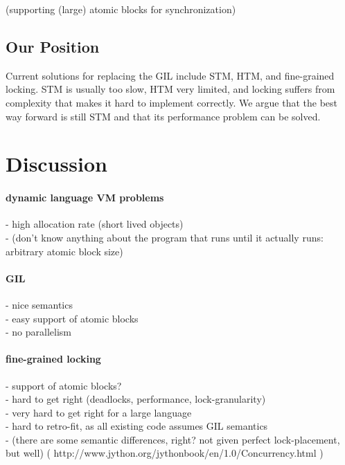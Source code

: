 \documentclass{sigplanconf}
\begin{document}
(supporting (large) atomic blocks for synchronization)

\subsection*{Our Position}
Current solutions for replacing the GIL include STM, HTM, and
fine-grained locking. STM is usually too slow, HTM very limited, and
locking suffers from complexity that makes it hard to implement
correctly. We argue that the best way forward is still STM and that
its performance problem can be solved.


\section{Discussion}
\paragraph{dynamic language VM problems}

- high allocation rate (short lived objects)\\
- (don't know anything about the program that runs until it actually runs: arbitrary atomic block size)

\paragraph{GIL}

- nice semantics\\
- easy support of atomic blocks\\
- no parallelism

\paragraph{fine-grained locking}

- support of atomic blocks?\\
- hard to get right (deadlocks, performance, lock-granularity)\\
- very hard to get right for a large language\\
- hard to retro-fit, as all existing code assumes GIL semantics\\
- (there are some semantic differences, right? not given perfect lock-placement, but well)
( http://www.jython.org/jythonbook/en/1.0/Concurrency.html )
\end{document}
